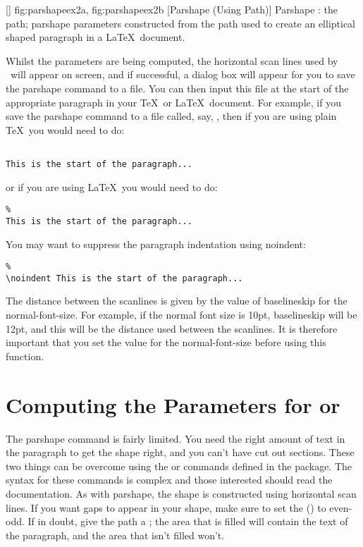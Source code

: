 [\small]
{
 {fig:parshapeex2a}{}{},
 {fig:parshapeex2b}{}{}
}
[Parshape (Using Path)]
{Parshape :
 the path;
 \gls{parshape} parameters constructed from the 
path 
used to create an elliptical shaped paragraph in a \LaTeX\ document.}

Whilst the parameters are being computed, the horizontal
scan lines used by \FlowframTk\ will appear on screen, and if
successful, a dialog box will appear for you to save the
\gls{parshape} command to a file. You can then input this
file at the start of the appropriate paragraph in your \TeX\ or
\LaTeX\ document. For example, if you save the \gls{parshape}
command to a file called, say, , then if
you are using plain \TeX\ you would need to do:
\begin{verbatim}

This is the start of the paragraph...
\end{verbatim}
or if you are using \LaTeX\ you would need to do:
\begin{verbatim}
%
This is the start of the paragraph...
\end{verbatim}
You may want to suppress the paragraph indentation using
\gls{noindent}:
\begin{verbatim}
%
\noindent This is the start of the paragraph...
\end{verbatim}

The distance between the scanlines is given by the
value of \gls{baselineskip} for the \gls{normal-font-size}.
For example, if the normal font size is 10\gls{pt}, \gls{baselineskip}
will be 12pt, and this will be the distance used between
the scanlines. It is therefore important that you set the value
for the \gls{normal-font-size} before using this function.


\section{Computing the Parameters for  or
}
\label{sec:shapepar}


The \gls{parshape} command is fairly limited. You need the right
amount of text in the paragraph to get the shape right, and you
can't have cut out sections. These two things can be overcome using
the  or  commands
defined in the  package. The syntax for these commands
is complex and those interested should read the 
documentation. As with \gls{parshape}, the shape is constructed
using horizontal scan lines. If you want gaps to appear in your
shape, make sure to set the 
() to even-odd.  If in doubt, give the
\gls{path} a ; the area that is filled will
contain the text of the paragraph, and the area that isn't filled
won't.

